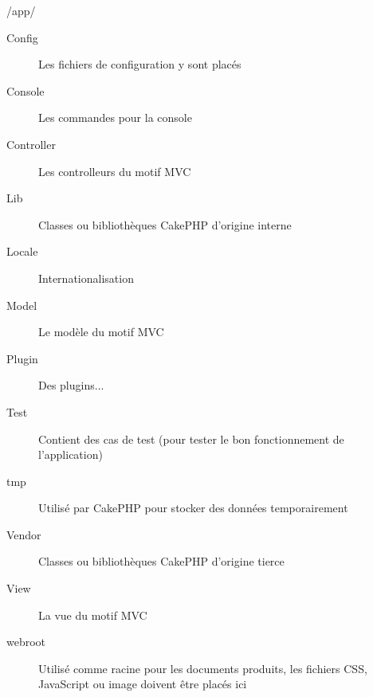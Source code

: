 \begin{frame}{/app/}
\begin{description}
  \item [Config] Les fichiers de configuration y sont placés
  \item [Console] Les commandes pour la console
  \item [Controller] Les controlleurs du motif MVC
  \item [Lib] Classes ou bibliothèques CakePHP d'origine interne
  \item [Locale] Internationalisation
  \item [Model] Le modèle du motif MVC
  \item [Plugin] Des plugins...
  \item [Test] Contient des cas de test (pour tester le bon fonctionnement de l'application)
  \item [tmp] Utilisé par CakePHP pour stocker des données temporairement
  \item [Vendor] Classes ou bibliothèques CakePHP d'origine tierce
  \item [View] La vue du motif MVC
  \item [webroot] Utilisé comme racine pour les documents produits, les fichiers CSS, JavaScript ou image doivent être placés ici
\end{description}
\end{frame}



